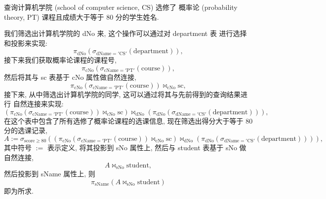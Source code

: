 \documentclass[10pt,UTF8]{book} %
\begin{document}
\begin{example}
    查询计算机学院 (school of computer science, CS) 选修了
    概率论 (probability theory, PT) 课程且成绩大于等于 80 分的学生姓名.
    \begin{sol}
        我们筛选出计算机学院的 dNo 来, 这个操作可以通过对 department 表
        进行选择和投影来实现:
        \[ \pi_\mathrm{dNo} \left(
            \sigma_\mathrm{dName = 'CS'}(\mathrm{department})
        \right), \]
        接下来我们获取概率论课程的课程号,
        \[ \pi_\mathrm{cNo} \left(
            \sigma_\mathrm{cName = 'PT'} (\mathrm{course})
        \right), \]
        然后将其与 sc 表基于 cNo 属性做自然连接,
        \[ \pi_\mathrm{cNo} \left(
            \sigma_\mathrm{cName = 'PT'} (\mathrm{course})
        \right) \Join_\mathrm{cNo} \mathrm{sc}, \]
        接下来, 从中筛选出计算机学院的同学, 这可以通过将其与先前得到的查询结果进行
        自然连接来实现:
        \[ \left(
            \pi_\mathrm{cNo} \left(
            \sigma_\mathrm{cName = 'PT'} (\mathrm{course})
        \right) \Join_\mathrm{cNo} \mathrm{sc}
        \right) \Join_\mathrm{dNo} \left(
            \pi_\mathrm{dNo} \left(
            \sigma_\mathrm{dName = 'CS'}(\mathrm{department})
        \right)
        \right),\]
        在这个表中包含了所有选修了概率论课程的选课信息,
        现在筛选出得分大于等于 80 分的选课记录,
        \[ A := \sigma_\mathrm{score \geqslant 80} \left(
            \left(
            \pi_\mathrm{cNo} \left(
            \sigma_\mathrm{cName = 'PT'} (\mathrm{course})
        \right) \Join_\mathrm{cNo} \mathrm{sc}
        \right) \Join_\mathrm{dNo} \left(
            \pi_\mathrm{dNo} \left(
            \sigma_\mathrm{dName = 'CS'}(\mathrm{department})
        \right)
        \right)
        \right), \]
        其中符号 $:=$ 表示定义,
        将其投影到 sNo 属性上, 然后与 student 表基于 sNo 做自然连接,
        \[ A \Join_\mathrm{sNo} \mathrm{student}, \]
        然后投影到 sName 属性上, 则
        \[ \pi_\mathrm{sName} \left(
            A \Join_\mathrm{sNo} \mathrm{student}
        \right) \]
        即为所求.
    \end{sol}
\end{example}
\end{document}
